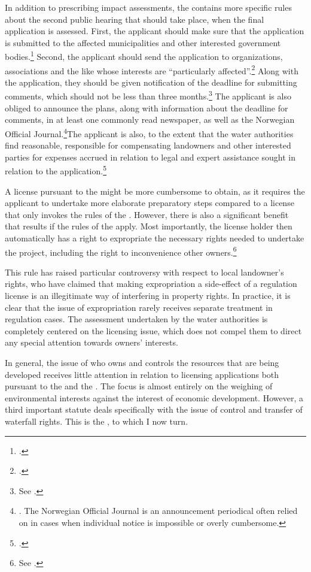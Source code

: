In addition to prescribing impact assessments, the \cite{wra17} contains more specific rules about the second public hearing that should take place, when the final application is assessed. First, the applicant should make sure that the application is submitted to the affected municipalities and other interested government bodies.\footcite[6]{wra17} Second, the applicant should send the application to organizations, associations and the like whose interests are ``particularly affected''.\footcite[6]{wra17} Along with the application, they should be given notification of the deadline for submitting comments, which should not be less than three months.\footnote{See \cite[6]{wra17}.} The applicant is also obliged to announce the plans, along with information about the deadline for comments, in at least one commonly read newspaper, as well as the Norwegian Official Journal.\footnote{\cite[6]{wra17}. The Norwegian Official Journal is an announcement periodical often relied on in cases when individual notice is impossible or overly cumbersome.}The applicant is also, to the extent that the water authorities find reasonable, responsible for compensating landowners and other interested parties for expenses accrued in relation to legal and expert assistance sought in relation to the application.\footcite[6]{wra17}

A license pursuant to the \cite{wra17} might be more cumbersome to obtain, as it requires the applicant to undertake more elaborate preparatory steps compared to a license that only invokes the rules of the \cite{wra00}. However, there is also a significant benefit that results if the rules of the \cite{wra17} apply. Most importantly, the license holder then automatically has a right to expropriate the necessary rights needed to undertake the project, including the right to inconvenience other owners.\footnote{See \cite[16]{wra17}.} 

This rule has raised particular controversy with respect to local landowner's rights, who have claimed that making expropriation a side-effect of a regulation license is an illegitimate way of interfering in property rights. In practice, it is clear that the issue of expropriation rarely receives separate treatment in regulation cases. The assessment undertaken by the water authorities is completely centered on the licensing issue, which does not compel them to direct any special attention towards owners' interests. 

In general, the issue of who owns and controls the resources that are being developed receives little attention in relation to licensing applications both pursuant to the \cite{wra17} and the \cite{wra00}. The focus is almost entirely on the weighing of environmental interests against the interest of economic development. However, a third important statute deals specifically with the issue of control and transfer of waterfall rights. This is the \cite{ica17}, to which I now turn. 

